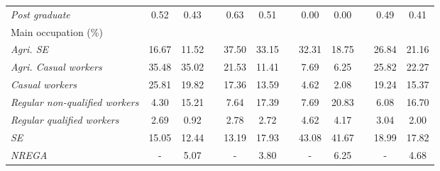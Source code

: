 \begin{table}[htbp]
{\begin{tabular}{lccccccccccc}
    \textit{Post graduate} & 0.52 & 0.43 &   & 0.63 & 0.51 &   & 0.00 & 0.00 &   & 0.49 & 0.41 \\
    Main occupation (\%) &   &   &   &   &   &   &   &   &   &   &  \\
    \textit{Agri. SE} & 16.67 & 11.52 &   & 37.50 & 33.15 &   & 32.31 & 18.75 &   & 26.84 & 21.16 \\
    \textit{Agri. Casual workers} & 35.48 & 35.02 &   & 21.53 & 11.41 &   & 7.69 & 6.25 &   & 25.82 & 22.27 \\
    \textit{Casual workers} & 25.81 & 19.82 &   & 17.36 & 13.59 &   & 4.62 & 2.08 &   & 19.24 & 15.37 \\
    \textit{Regular non-qualified workers} & 4.30 & 15.21 &   & 7.64 & 17.39 &   & 7.69 & 20.83 &   & 6.08 & 16.70 \\
    \textit{Regular qualified workers} & 2.69 & 0.92 &   & 2.78 & 2.72 &   & 4.62 & 4.17 &   & 3.04 & 2.00 \\
    \textit{SE} & 15.05 & 12.44 &   & 13.19 & 17.93 &   & 43.08 & 41.67 &   & 18.99 & 17.82 \\
    \textit{NREGA} & - & 5.07 &   & - & 3.80 &   & - & 6.25 &   & - & 4.68 \\
    \bottomrule
    \end{tabular}%

	}
  \label{Global}%
\end{table}%
